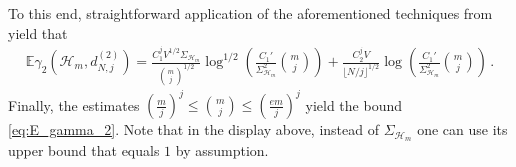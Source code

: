 \documentclass[12pt]{article}
\def\l{\left}
\def\r{\right}
\newcommand{\m}{\mathcal}
\newcommand{\mb}{\mathbb}
\newcommand{\scolor}[1]{\textcolor{red}{#1}} %
\theoremstyle{thmstyletwo}%
\theoremstyle{thmstylethree}%
\begin{document}
To this end, straightforward application of the aforementioned techniques from \citep{koltchinskii2011oracle} yield that %
\begin{align*}
    \mb E \gamma_{2} \l(\mathcal{H}_m, d^{(2)}_{N,j}\r) = \frac{C^j_1 V^{1/2}\Sigma_{\m H_m}}{{m \choose j}^{1/2}} \log^{1/2} \l(\frac{C_1'}{\Sigma_{\m H_m}^2}{m \choose j}\r) + \frac{C^j_2V}{\lfloor N/j \rfloor^{1/2}} \log \l(\frac{C_1'}{\Sigma_{\m H_m}^2}{m \choose j}\r)\,.
\end{align*}
Finally, the estimates $\l(\frac{m}{j}\r)^j \leq {m \choose j} \leq \l(\frac{em}{j}\r)^j$ yield the bound \eqref{eq:E_gamma_2}. Note that in the display above, instead of $\Sigma_{\m H_m}$ one can use its upper bound that equals $1$ by assumption.
\end{document}

